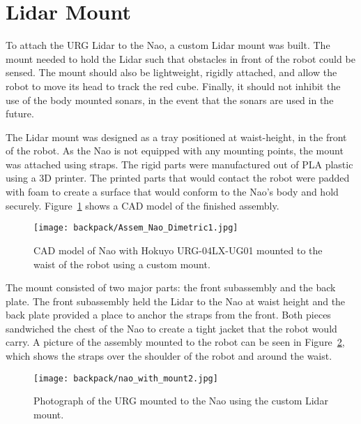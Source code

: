 \section{Lidar Mount}
To attach the URG Lidar to the Nao, a custom Lidar mount was built.
The mount needed to hold the Lidar such that obstacles in front of the robot
could be sensed. The mount should also be lightweight, rigidly attached, and allow
the robot to move its head to track the red cube. Finally, it should not inhibit
the use of the body mounted sonars, in the event that the sonars are used in the
future.

The Lidar mount was designed as a tray positioned at waist-height, 
in the front of the robot.
As the Nao is not equipped with any mounting points, the mount was attached
using straps. The rigid parts were manufactured out of PLA plastic using a 3D
printer. The printed parts that would contact the robot were padded with foam to
create a surface that would conform to the Nao's body and hold securely.
Figure~\ref{fig:nao_lidar_mount_nao_dimetric1} shows a CAD model of the finished
assembly.

\begin{figure}
\centering
\texttt{[image: backpack/Assem\_Nao\_Dimetric1.jpg]}
\caption{CAD model of Nao with Hokuyo URG-04LX-UG01 mounted
         to the waist of the robot using a custom mount.}
\label{fig:nao_lidar_mount_nao_dimetric1}
\end{figure}

The mount consisted of two major parts: the front subassembly and the back plate.
The front subassembly held the Lidar to the Nao at waist height and the back plate
provided a place to anchor the straps from the front. Both pieces sandwiched the
chest of the Nao to create a tight jacket that the robot would carry.
A picture of the assembly mounted to the robot can be seen in
Figure~\ref{fig:nao_lidar_mount_picture1}, which shows the straps over the
shoulder of the robot and around the waist.

\begin{figure}
\centering
\texttt{[image: backpack/nao\_with\_mount2.jpg]}
\caption{Photograph of the URG mounted to the Nao using the
         custom Lidar mount.}
\label{fig:nao_lidar_mount_picture1}
\end{figure}

